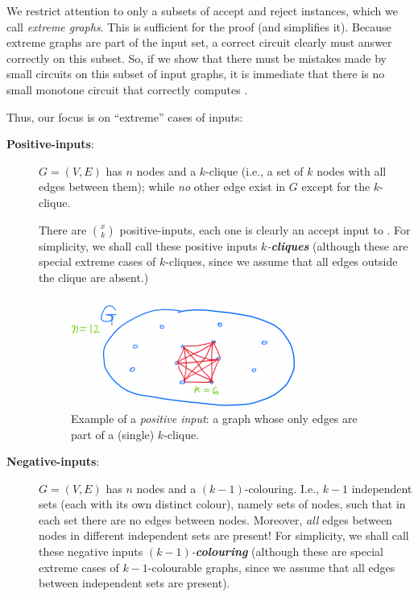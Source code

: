 We  restrict attention to only a subsets of accept and reject instances, which we call \emph{extreme graphs}. This is sufficient for the proof (and simplifies it). 
Because extreme graphs are part of the input set, a correct circuit clearly must answer correctly on this subset. So, if we show that there must be mistakes made by small circuits on this subset of input graphs, it is immediate that there is no small monotone circuit that correctly computes \cliquenk.



Thus, our focus is on ``extreme'' cases of inputs:

\begin{description}
\item[\textbf{Positive-inputs}:] 
 $G=(V,E)$ has $n$ nodes and a $k$-clique (i.e., a set of $k$ nodes with all edges between them); while \emph{no} other edge exist in $G$ except for the $k$-clique.

There are $\binom{x}{k}$ positive-inputs, each one is clearly an accept input to \cliquenk.
For simplicity, we shall call these positive inputs \emph{$k$-\textbf{cliques}} (although these are special extreme cases of $k$-cliques, since we assume that all edges outside the clique are absent.) 

\begin{figure}[H]
    \centering
    \includegraphics[width=.5\linewidth]{images/clique1.png}
    \caption{Example of a \emph{positive input}: a graph whose only edges are part of a (single) $k$-clique.}
    \label{fig:enter-label}
\end{figure}


\item[\textbf{Negative-inputs}:] 

$G=\left(V,E\right)$ has $n$ nodes and a $(k-1)$-colouring. I.e., $k-1$ independent sets (each with its own distinct colour), namely sets of nodes, such that in each set there are no edges between nodes. Moreover,  \emph{all} edges between nodes in  different independent sets are present!
For simplicity, we shall call these negative inputs \emph{$(k-1)$-\textbf{colouring}} (although these are special extreme cases of $k-1$-colourable graphs, since we assume that all edges between independent sets are present). 



\end{description}
